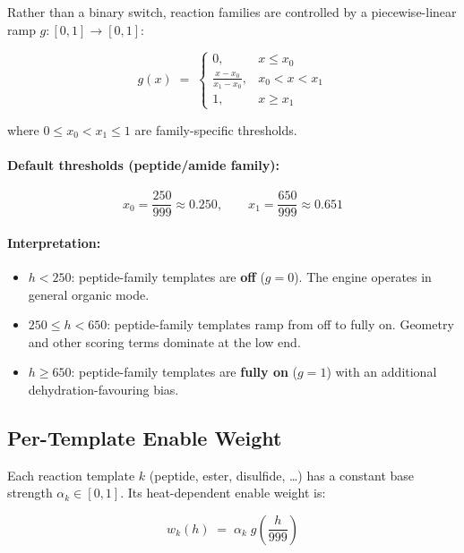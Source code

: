 \documentclass[11pt]{article}
\begin{document}
Rather than a binary switch, reaction families are controlled by a
piecewise-linear ramp $g\colon [0,1] \to [0,1]$:

\begin{equation}
\label{eq:gate}
g(x) \;=\;
\begin{cases}
0, & x \le x_0 \\[4pt]
\displaystyle\frac{x - x_0}{x_1 - x_0}, & x_0 < x < x_1 \\[6pt]
1, & x \ge x_1
\end{cases}
\end{equation}

where $0 \le x_0 < x_1 \le 1$ are family-specific thresholds.

\paragraph{Default thresholds (peptide/amide family):}
\begin{equation}
x_0 = \frac{250}{999} \approx 0.250, \qquad
x_1 = \frac{650}{999} \approx 0.651
\end{equation}

\paragraph{Interpretation:}
\begin{itemize}
\item $h < 250$: peptide-family templates are \textbf{off} ($g=0$).  The
      engine operates in general organic mode.
\item $250 \le h < 650$: peptide-family templates ramp from off to fully on.
      Geometry and other scoring terms dominate at the low end.
\item $h \ge 650$: peptide-family templates are \textbf{fully on} ($g=1$)
      with an additional dehydration-favouring bias.
\end{itemize}

\subsection{Per-Template Enable Weight}

Each reaction template $k$ (peptide, ester, disulfide, \ldots) has a
constant base strength $\alpha_k \in [0,1]$.  Its heat-dependent enable
weight is:

\begin{equation}
\label{eq:enable_weight}
w_k(h) \;=\; \alpha_k \; g\!\!\left(\frac{h}{999}\right)
\end{equation}
\end{document}
